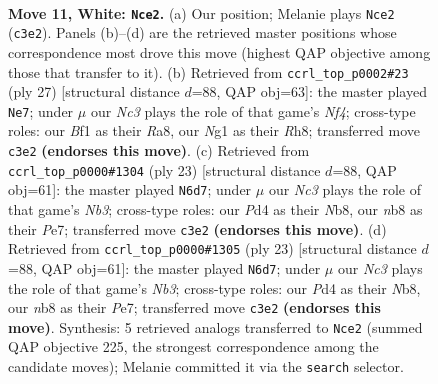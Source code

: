 \documentclass[11pt]{article}
\begin{document}
\clearpage

\begin{figure}[p]\centering
\begin{subfigure}{0.46\textwidth}\centering
\resizebox{\linewidth}{!}{%
\newchessgame
\chessboard[
  setfen={rnb2rk1/2pn1ppp/pp2p3/3pP3/1q1P1P1P/2N5/PPP2KP1/1R1Q1BNR w - - 0 11},
  showmover=false,
  pgfstyle=straightmove, color=movearrow, markmove={c3-e2}
]}
\caption{}
\end{subfigure}\hfill
\begin{subfigure}{0.46\textwidth}\centering
\resizebox{\linewidth}{!}{%
\newchessgame
\chessboard[
  setfen={r2qk2r/pp1n1pp1/4p3/1QbpPn2/3N3p/1PP2N2/P4PPP/R1B2RK1 b kq - 3 14},
  showmover=false,
  pgfstyle=straightmove, color=movearrow, markmove={f5-e7}
]}
\caption{}
\end{subfigure}
\\[4pt]
\begin{subfigure}{0.46\textwidth}\centering
\resizebox{\linewidth}{!}{%
\newchessgame
\chessboard[
  setfen={rn1q1rk1/1p2ppbp/1n4p1/p1P1Pb2/P7/1QP2N2/1P2B1PP/RNB2RK1 b - - 0 12},
  showmover=false,
  pgfstyle=straightmove, color=movearrow, markmove={b6-d7}
]}
\caption{}
\end{subfigure}\hfill
\begin{subfigure}{0.46\textwidth}\centering
\resizebox{\linewidth}{!}{%
\newchessgame
\chessboard[
  setfen={rn1q1rk1/1p2ppbp/1n4p1/p1P1Pb2/P7/1QP2N2/1P2B1PP/RNB2RK1 b - - 0 12},
  showmover=false,
  pgfstyle=straightmove, color=movearrow, markmove={b6-d7}
]}
\caption{}
\end{subfigure}
\caption{\textbf{Move 11, White: \texttt{Nce2}.} (a) Our position; Melanie plays \texttt{Nce2} (\texttt{c3e2}). Panels (b)--(d) are the retrieved master positions whose correspondence most drove this move (highest QAP objective among those that transfer to it). (b) Retrieved from \texttt{ccrl\_top\_p0002\#23} (ply 27) [structural distance $d$=88, QAP obj=63]: the master played \texttt{Ne7}; under $\mu$ our \emph{Nc3} plays the role of that game's \emph{Nf4}; cross-type roles: our \emph{B}f1 as their \emph{R}a8, our \emph{N}g1 as their \emph{R}h8; transferred move \texttt{c3e2} \textbf{(endorses this move)}. (c) Retrieved from \texttt{ccrl\_top\_p0000\#1304} (ply 23) [structural distance $d$=88, QAP obj=61]: the master played \texttt{N6d7}; under $\mu$ our \emph{Nc3} plays the role of that game's \emph{Nb3}; cross-type roles: our \emph{P}d4 as their \emph{N}b8, our \emph{n}b8 as their \emph{P}e7; transferred move \texttt{c3e2} \textbf{(endorses this move)}. (d) Retrieved from \texttt{ccrl\_top\_p0000\#1305} (ply 23) [structural distance $d$=88, QAP obj=61]: the master played \texttt{N6d7}; under $\mu$ our \emph{Nc3} plays the role of that game's \emph{Nb3}; cross-type roles: our \emph{P}d4 as their \emph{N}b8, our \emph{n}b8 as their \emph{P}e7; transferred move \texttt{c3e2} \textbf{(endorses this move)}. Synthesis: 5 retrieved analogs transferred to \texttt{Nce2} (summed QAP objective 225, the strongest correspondence among the candidate moves); Melanie committed it via the \texttt{search} selector.}
\label{fig:thought-m20}
\end{figure}
\end{document}
